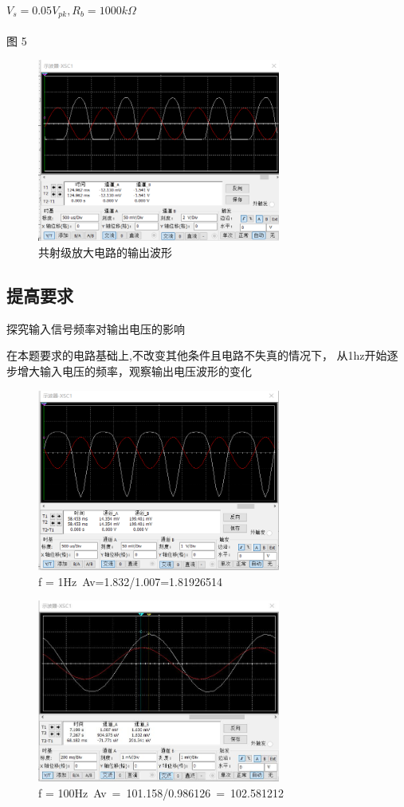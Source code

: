 \documentclass[10pt, conference, compsocconf, a4paper]{IEEEtran}
\begin{document}
\paragraph{$V_{s} = 0.05V_{pk} , R_b = 1000k\Omega$}图 5

\begin{figure}[H]
  \includegraphics[width=8cm]{img/d.png}
  \caption{共射级放大电路的输出波形}
\end{figure}



\subsection{提高要求}
探究输入信号频率对输出电压的影响\par
在本题要求的电路基础上,不改变其他条件且电路不失真的情况下，
从1hz开始逐步增大输入电压的频率，观察输出电压波形的变化
\begin{figure}[H]
  \includegraphics[width=8cm]{img/e.png}
  \caption{f = 1Hz Av=1.832/1.007=1.81926514}
\end{figure}

\begin{figure}[H]
  \includegraphics[width=8cm]{img/f.png}
  \caption{f = 100Hz Av = 101.158/0.986126 = 102.581212}
\end{figure}
\end{document}

